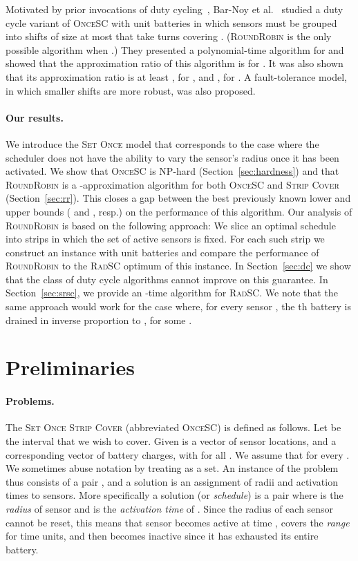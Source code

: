 \documentclass[11pt]{article}
\newcommand{\strip}{\textsc{Strip Cover}\xspace}
\newcommand{\sosc}{\textsc{OnceSC}\xspace}
\newcommand{\srsc}{\textsc{RadSC}\xspace}
\newcommand{\rr}{\textsc{RoundRobin}\xspace}
\begin{document}
Motivated by prior invocations of duty
cycling~\cite{slijepcevic2001power,perillo2003optimal,abrams2004set,cardei2005improving,cardei2006improving,cardei2005maximum},
Bar-Noy et al.~\cite{BBR12} studied a duty cycle variant of \sosc with
unit batteries in which sensors must be grouped into shifts of size at
most  that take turns covering .  (\rr is the only possible
algorithm when .)  They presented a polynomial-time algorithm for
 and showed that the approximation ratio of this algorithm is
 for .  It was also shown that its approximation
ratio is at least , for , and ,
for . A fault-tolerance model, in which smaller shifts are more
robust, was also proposed.



\paragraph*{\bf Our results.}
We introduce the \textsc{Set Once} model that corresponds to the case
where the scheduler does not have the ability to vary the sensor's
radius once it has been activated.  We show that \sosc is NP-hard
(Section~\ref{sec:hardness}) and that \rr is a
-approximation algorithm for both \sosc and \strip
(Section~\ref{sec:rr}).  This closes a gap between the best previously
known lower and upper bounds ( and , resp.) on the
performance of this algorithm.
Our analysis of \rr is based on the following approach:  We slice an
optimal schedule into strips in which the set of active sensors is
fixed.  For each such strip we construct an instance with unit
batteries and compare the performance of \rr to the \srsc optimum of
this instance.
In Section~\ref{sec:dc} we show that the class of duty cycle
algorithms cannot improve on this  guarantee.
In Section~\ref{sec:srsc}, we provide an -time
algorithm for \srsc.  We note that the same approach would work for
the case where, for every sensor , the th battery is drained in
inverse proportion to , for some .






\section{Preliminaries}
\label{sec:prelim}

\paragraph*{\bf Problems.}
The \textsc{Set Once Strip Cover} (abbreviated \sosc) is defined as
follows. Let  be the interval that we wish to cover.
Given is a vector  of  sensor
locations, and a corresponding vector  of battery charges, with  for all .  We
assume that  for every .  We
sometimes abuse notation by treating  as a set.  An instance of the
problem thus consists of a pair , and a solution is an
assignment of radii and activation times to sensors.  More
specifically a solution (or \emph{schedule}) is a pair  where  is the \emph{radius} of sensor  and
 is the \emph{activation time} of . Since the radius of
each sensor cannot be reset, this means that sensor  becomes active
at time , covers the \emph{range}  for  time units, and then becomes inactive since
it has exhausted its entire battery.
\end{document}
